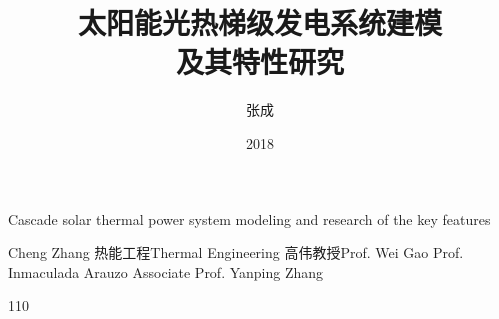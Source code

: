 \makenomenclature

\title{太阳能光热梯级发电系统建模\\及其特性研究}{Cascade solar thermal power system modeling and research of the key features}
\author
{张成}{Cheng Zhang}
\major
{热能工程}{Thermal Engineering}
\supervisor
{高伟\hspace{0.2em}教授}{Prof. Wei Gao \newline Prof. Inmaculada Arauzo \newline Associate Prof. Yanping Zhang}
\date{2018}{1}{10}